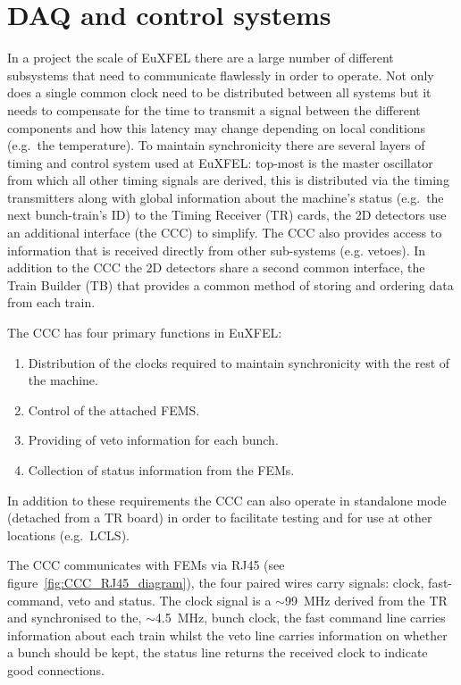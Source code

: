 \section{DAQ and control systems} %
\label{sec:daq_and_control_systems}
In a project the scale of EuXFEL there are a large number of different subsystems that need to communicate flawlessly in order to operate. Not only does a single common clock need to be distributed between all systems but it needs to compensate for the time to transmit a signal between the different components and how this latency may change depending on local conditions (e.g.\ the temperature). To maintain synchronicity there are several layers of timing and control system used at EuXFEL: top-most is the master oscillator from which all other timing signals are derived, this is distributed via the timing transmitters along with global information about the machine's status (e.g.\ the next bunch-train's ID) to the Timing Receiver (TR) cards, the 2D detectors use an additional interface (the CCC) to simplify. The CCC also provides access to information that is received directly from other sub-systems (e.g. vetoes). In addition to the CCC the 2D detectors share a second common interface, the Train Builder (TB) that provides a common method of storing and ordering data from each train.

The CCC has four primary functions in EuXFEL: 
\begin{enumerate}
  \item Distribution of the clocks required to maintain synchronicity with the rest of the machine.
  \item Control of the attached FEMS.
  \item Providing of veto information for each bunch.
  \item Collection of status information from the FEMs.
\end{enumerate}
In addition to these requirements the CCC can also operate in standalone mode (detached from a TR board) in order to facilitate testing and for use at other locations (e.g.\ LCLS). 

The CCC communicates with FEMs via RJ45 (see figure~\ref{fig:CCC_RJ45_diagram}), the four paired wires carry signals: clock, fast-command, veto and status. The clock signal is a \(\sim\)99~MHz derived from the TR and synchronised to the, \(\sim\)4.5~MHz, bunch clock, the fast command line carries information about each train whilst the veto line carries information on whether a bunch should be kept, the status line returns the received clock to indicate good connections.
